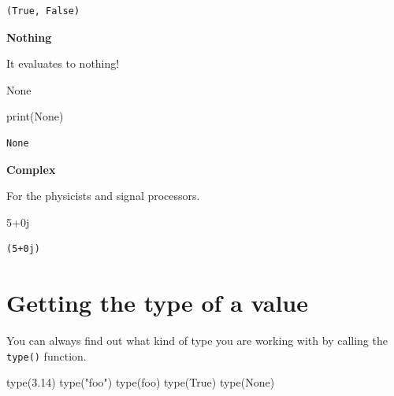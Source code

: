 \documentclass[
  letterpaper,
  DIV=11,
  numbers=noendperiod]{scrreprt}
\newenvironment{Shaded}{\begin{snugshade}}{\end{snugshade}}
\newcommand{\BuiltInTok}[1]{\textcolor[rgb]{0.00,0.23,0.31}{#1}}
\newcommand{\DecValTok}[1]{\textcolor[rgb]{0.68,0.00,0.00}{#1}}
\newcommand{\FloatTok}[1]{\textcolor[rgb]{0.68,0.00,0.00}{#1}}
\newcommand{\NormalTok}[1]{\textcolor[rgb]{0.00,0.23,0.31}{#1}}
\newcommand{\OperatorTok}[1]{\textcolor[rgb]{0.37,0.37,0.37}{#1}}
\newcommand{\OtherTok}[1]{\textcolor[rgb]{0.00,0.23,0.31}{#1}}
\newcommand{\StringTok}[1]{\textcolor[rgb]{0.13,0.47,0.30}{#1}}
\newcommand{\VariableTok}[1]{\textcolor[rgb]{0.07,0.07,0.07}{#1}}
\begin{document}
\begin{verbatim}
(True, False)
\end{verbatim}

\textbf{Nothing}

It evaluates to nothing!

\begin{Shaded}
\begin{Highlighting}[]
\VariableTok{None}
\end{Highlighting}
\end{Shaded}

\begin{Shaded}
\begin{Highlighting}[]
\BuiltInTok{print}\NormalTok{(}\VariableTok{None}\NormalTok{)}
\end{Highlighting}
\end{Shaded}

\begin{verbatim}
None
\end{verbatim}

\textbf{Complex}

For the physicists and signal processors.

\begin{Shaded}
\begin{Highlighting}[]
\DecValTok{5}\OperatorTok{+}\OtherTok{0j}
\end{Highlighting}
\end{Shaded}

\begin{verbatim}
(5+0j)
\end{verbatim}

\hypertarget{getting-the-type-of-a-value}{%
\chapter{Getting the type of a
value}\label{getting-the-type-of-a-value}}

You can always find out what kind of type you are working with by
calling the \texttt{type()} function.

\begin{Shaded}
\begin{Highlighting}[]
\BuiltInTok{type}\NormalTok{(}\FloatTok{3.14}\NormalTok{)}
\BuiltInTok{type}\NormalTok{(}\StringTok{"foo"}\NormalTok{)}
\BuiltInTok{type}\NormalTok{(}\StringTok{\textquotesingle{}foo\textquotesingle{}}\NormalTok{)}
\BuiltInTok{type}\NormalTok{(}\VariableTok{True}\NormalTok{)}
\BuiltInTok{type}\NormalTok{(}\VariableTok{None}\NormalTok{)}
\end{Highlighting}
\end{Shaded}
\end{document}

